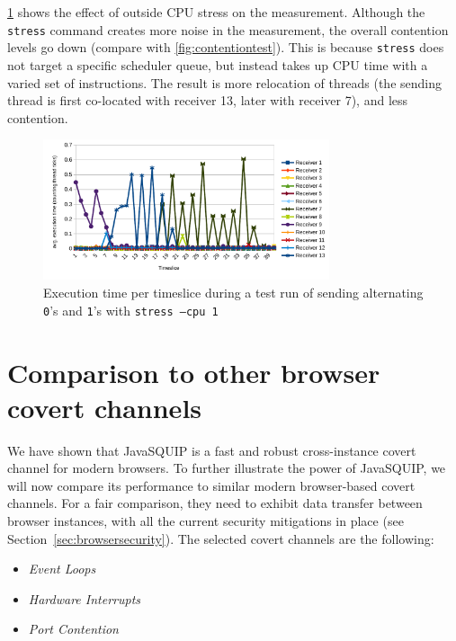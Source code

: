 \documentclass[11pt,
  titlepage=false,
]{scrreprt}
\begin{document}
\ref{fig:contentiontest_stress} shows the effect of outside CPU stress on the measurement.
Although the \texttt{stress} command creates more noise in the measurement, the overall contention levels go down (compare with \ref{fig:contentiontest}).
This is because \texttt{stress} does not target a specific scheduler queue, but instead takes up CPU time with a varied set of instructions.
The result is more relocation of threads (the sending thread is first co-located with receiver 13, later with receiver 7), and less contention.

\begin{figure}
    \centering
    \includegraphics[width=0.75\textwidth]{figures/contentiontest_stress}

    \caption{Execution time per timeslice during a test run of sending alternating \texttt{0}'s and \texttt{1}'s with \texttt{stress --cpu 1}}
    \label{fig:contentiontest_stress}
\end{figure}

\pagebreak
\chapter{Comparison to other browser covert channels}
\label{ch:comparison}
We have shown that JavaSQUIP is a fast and robust cross-instance covert channel for modern browsers.
To further illustrate the power of JavaSQUIP,
we will now compare its performance to similar modern browser-based covert channels.
For a fair comparison, they need to exhibit data transfer between browser instances,
with all the current security mitigations in place (see Section~\ref{sec:browsersecurity}).
The selected covert channels are the following:

\begin{itemize}
    \item \textit{Event Loops}~\cite{vila2017loophole}
    \item \textit{Hardware Interrupts}~\cite{lipp2017practical}
    \item \textit{Port Contention}~\cite{Rokicki2022webport}
\end{itemize}
\end{document}
